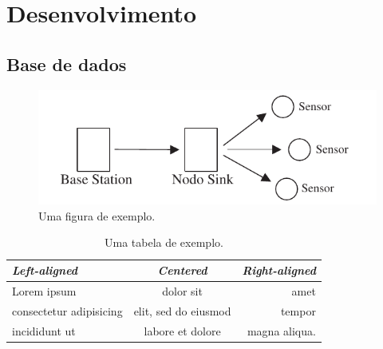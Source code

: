 \chapter{Desenvolvimento}

\dummytxtb\dummytxta\dummytxtc
\section{Base de dados}
\begin{figure}[ht]
    \centering
    \includegraphics{img/exemplo}
    \caption{Uma figura de exemplo.}
\end{figure}

\dummytxtb

\begin{table}[ht]
    \caption{Uma tabela de exemplo.}
    {\centering
    \begin{tabular}{lcr} \toprule
    \emph{Left-aligned} & \emph{Centered} & \emph{Right-aligned} \\ \midrule
    Lorem ipsum & dolor sit & amet \\
    consectetur adipisicing & elit, sed do eiusmod & tempor \\
    incididunt ut & labore et dolore & magna aliqua. \\ \bottomrule
    \end{tabular}\par
    }
\end{table}
